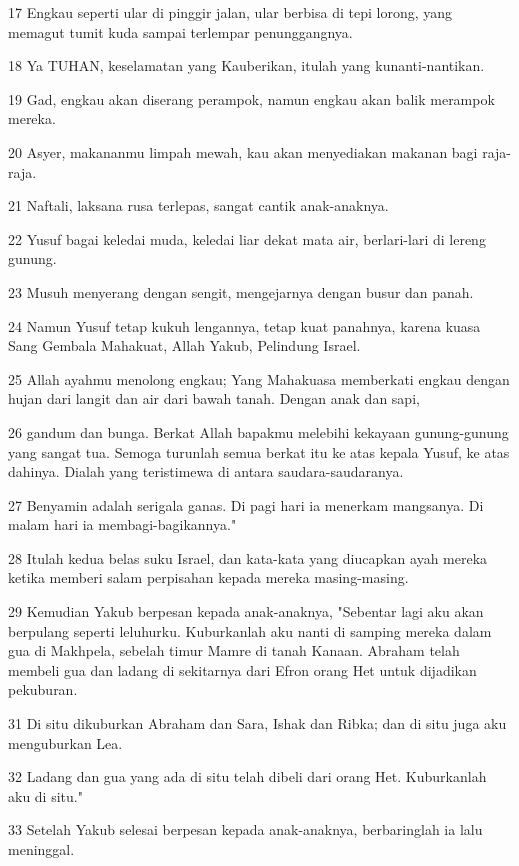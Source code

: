 \par 17 Engkau seperti ular di pinggir jalan, ular berbisa di tepi lorong, yang memagut tumit kuda sampai terlempar penunggangnya.
\par 18 Ya TUHAN, keselamatan yang Kauberikan, itulah yang kunanti-nantikan.
\par 19 Gad, engkau akan diserang perampok, namun engkau akan balik merampok mereka.
\par 20 Asyer, makananmu limpah mewah, kau akan menyediakan makanan bagi raja-raja.
\par 21 Naftali, laksana rusa terlepas, sangat cantik anak-anaknya.
\par 22 Yusuf bagai keledai muda, keledai liar dekat mata air, berlari-lari di lereng gunung.
\par 23 Musuh menyerang dengan sengit, mengejarnya dengan busur dan panah.
\par 24 Namun Yusuf tetap kukuh lengannya, tetap kuat panahnya, karena kuasa Sang Gembala Mahakuat, Allah Yakub, Pelindung Israel.
\par 25 Allah ayahmu menolong engkau; Yang Mahakuasa memberkati engkau dengan hujan dari langit dan air dari bawah tanah. Dengan anak dan sapi,
\par 26 gandum dan bunga. Berkat Allah bapakmu melebihi kekayaan gunung-gunung yang sangat tua. Semoga turunlah semua berkat itu ke atas kepala Yusuf, ke atas dahinya. Dialah yang teristimewa di antara saudara-saudaranya.
\par 27 Benyamin adalah serigala ganas. Di pagi hari ia menerkam mangsanya. Di malam hari ia membagi-bagikannya."
\par 28 Itulah kedua belas suku Israel, dan kata-kata yang diucapkan ayah mereka ketika memberi salam perpisahan kepada mereka masing-masing.
\par 29 Kemudian Yakub berpesan kepada anak-anaknya, "Sebentar lagi aku akan berpulang seperti leluhurku. Kuburkanlah aku nanti di samping mereka dalam gua di Makhpela, sebelah timur Mamre di tanah Kanaan. Abraham telah membeli gua dan ladang di sekitarnya dari Efron orang Het untuk dijadikan pekuburan.
\par 31 Di situ dikuburkan Abraham dan Sara, Ishak dan Ribka; dan di situ juga aku menguburkan Lea.
\par 32 Ladang dan gua yang ada di situ telah dibeli dari orang Het. Kuburkanlah aku di situ."
\par 33 Setelah Yakub selesai berpesan kepada anak-anaknya, berbaringlah ia lalu meninggal.

